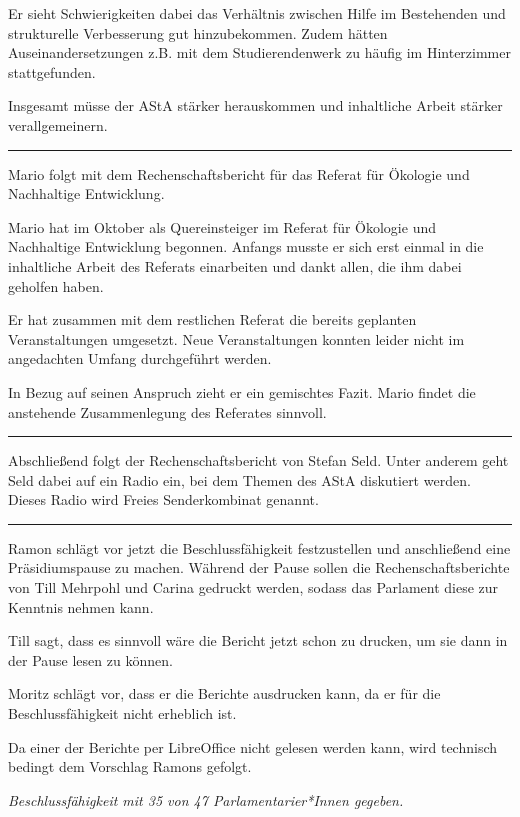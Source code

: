 \documentclass[ngerman,headheight=70pt]{scrartcl}
\begin{document}
    Er sieht Schwierigkeiten dabei das Verhältnis zwischen Hilfe im Bestehenden
    und strukturelle Verbesserung gut hinzubekommen. Zudem hätten
    Auseinandersetzungen z.B. mit dem Studierendenwerk zu häufig im Hinterzimmer
    stattgefunden.

    Insgesamt müsse der AStA stärker herauskommen und inhaltliche Arbeit
    stärker verallgemeinern.

    \hrule

    Mario folgt mit dem Rechenschaftsbericht für das Referat für Ökologie
    und Nachhaltige Entwicklung.

    Mario hat im Oktober als Quereinsteiger im Referat für Ökologie und
    Nachhaltige Entwicklung begonnen. Anfangs musste er sich erst einmal
    in die inhaltliche Arbeit des Referats einarbeiten und dankt allen,
    die ihm dabei geholfen haben.

    Er hat zusammen mit dem restlichen Referat die bereits geplanten Veranstaltungen
    umgesetzt. Neue Veranstaltungen konnten leider nicht im angedachten
    Umfang durchgeführt werden.

    In Bezug auf seinen Anspruch zieht er ein gemischtes Fazit. Mario findet
    die anstehende Zusammenlegung des Referates sinnvoll.

    \hrule

    Abschließend folgt der Rechenschaftsbericht von Stefan Seld.
    Unter anderem geht Seld dabei auf ein Radio ein, bei dem Themen des AStA
    diskutiert werden. Dieses Radio wird Freies Senderkombinat genannt.

    \hrule

    Ramon schlägt vor jetzt die Beschlussfähigkeit festzustellen und anschließend
    eine Präsidiumspause zu machen. Während der Pause sollen die Rechenschaftsberichte
    von Till Mehrpohl und Carina gedruckt werden, sodass das Parlament diese
    zur Kenntnis nehmen kann.

    Till sagt, dass es sinnvoll wäre die Bericht jetzt schon zu drucken, um sie
    dann in der Pause lesen zu können.

    Moritz schlägt vor, dass er die Berichte ausdrucken kann, da er für die
    Beschlussfähigkeit nicht erheblich ist.

    Da einer der Berichte per LibreOffice nicht gelesen werden kann,
    wird technisch bedingt dem Vorschlag Ramons gefolgt.

    \textit{Beschlussfähigkeit mit 35 von 47 Parlamentarier*Innen gegeben.}
\end{document}
